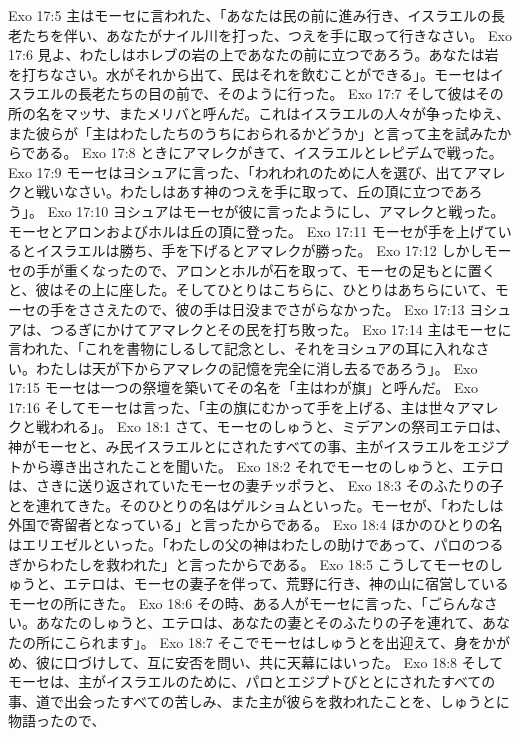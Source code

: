 Exo 17:5  主はモーセに言われた、「あなたは民の前に進み行き、イスラエルの長老たちを伴い、あなたがナイル川を打った、つえを手に取って行きなさい。
Exo 17:6  見よ、わたしはホレブの岩の上であなたの前に立つであろう。あなたは岩を打ちなさい。水がそれから出て、民はそれを飲むことができる」。モーセはイスラエルの長老たちの目の前で、そのように行った。
Exo 17:7  そして彼はその所の名をマッサ、またメリバと呼んだ。これはイスラエルの人々が争ったゆえ、また彼らが「主はわたしたちのうちにおられるかどうか」と言って主を試みたからである。
Exo 17:8  ときにアマレクがきて、イスラエルとレピデムで戦った。
Exo 17:9  モーセはヨシュアに言った、「われわれのために人を選び、出てアマレクと戦いなさい。わたしはあす神のつえを手に取って、丘の頂に立つであろう」。
Exo 17:10  ヨシュアはモーセが彼に言ったようにし、アマレクと戦った。モーセとアロンおよびホルは丘の頂に登った。
Exo 17:11  モーセが手を上げているとイスラエルは勝ち、手を下げるとアマレクが勝った。
Exo 17:12  しかしモーセの手が重くなったので、アロンとホルが石を取って、モーセの足もとに置くと、彼はその上に座した。そしてひとりはこちらに、ひとりはあちらにいて、モーセの手をささえたので、彼の手は日没までさがらなかった。
Exo 17:13  ヨシュアは、つるぎにかけてアマレクとその民を打ち敗った。
Exo 17:14  主はモーセに言われた、「これを書物にしるして記念とし、それをヨシュアの耳に入れなさい。わたしは天が下からアマレクの記憶を完全に消し去るであろう」。
Exo 17:15  モーセは一つの祭壇を築いてその名を「主はわが旗」と呼んだ。
Exo 17:16  そしてモーセは言った、「主の旗にむかって手を上げる、主は世々アマレクと戦われる」。
Exo 18:1  さて、モーセのしゅうと、ミデアンの祭司エテロは、神がモーセと、み民イスラエルとにされたすべての事、主がイスラエルをエジプトから導き出されたことを聞いた。
Exo 18:2  それでモーセのしゅうと、エテロは、さきに送り返されていたモーセの妻チッポラと、
Exo 18:3  そのふたりの子とを連れてきた。そのひとりの名はゲルショムといった。モーセが、「わたしは外国で寄留者となっている」と言ったからである。
Exo 18:4  ほかのひとりの名はエリエゼルといった。「わたしの父の神はわたしの助けであって、パロのつるぎからわたしを救われた」と言ったからである。
Exo 18:5  こうしてモーセのしゅうと、エテロは、モーセの妻子を伴って、荒野に行き、神の山に宿営しているモーセの所にきた。
Exo 18:6  その時、ある人がモーセに言った、「ごらんなさい。あなたのしゅうと、エテロは、あなたの妻とそのふたりの子を連れて、あなたの所にこられます」。
Exo 18:7  そこでモーセはしゅうとを出迎えて、身をかがめ、彼に口づけして、互に安否を問い、共に天幕にはいった。
Exo 18:8  そしてモーセは、主がイスラエルのために、パロとエジプトびととにされたすべての事、道で出会ったすべての苦しみ、また主が彼らを救われたことを、しゅうとに物語ったので、
